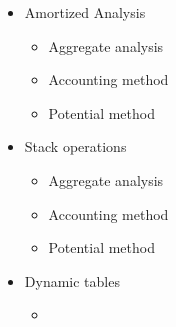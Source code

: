 \begin{itemize}
  \item Amortized Analysis
  \begin{itemize}
    \item Aggregate analysis
    \item Accounting method
    \item Potential method
  \end{itemize}
  \item Stack operations
  \begin{itemize}
    \item Aggregate analysis
    \item Accounting method
    \item Potential method
  \end{itemize}
  \item Dynamic tables
  \begin{itemize}
    \item
  \end{itemize}
\end{itemize}
